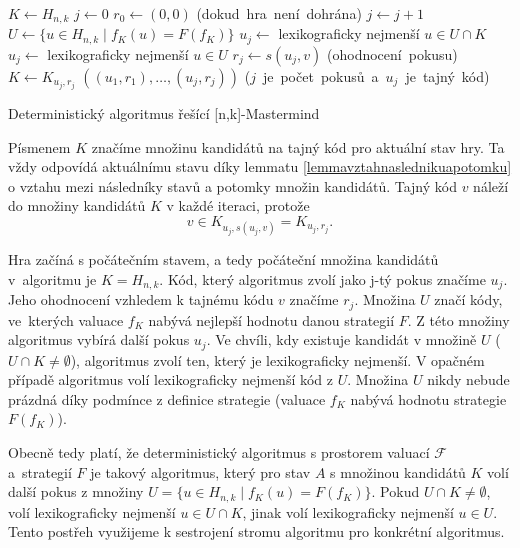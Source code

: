 
\begin{algorithm}[h!]
\begin{algorithmic}[1]  %
    \State $K \gets H_{n,k}$ 
    \State $j \gets 0$
    \State $r_0 \gets (0,0)$
     \hfill \mbox{(dokud hra není dohrána)}
        \State $j \gets j + 1$ 
	\State $U \gets \{u \in H_{n,k} \mid f_K(u) = F(f_K)\}$
            \State $u_j \gets$ lexikograficky nejmenší $u \in U \cap K$
	\Else
		\State $u_j \gets$ lexikograficky nejmenší $u \in U$
	\EndIf
        \State $r_j \gets s(u_j, v)$ \hfill \mbox{(ohodnocení pokusu)}
        \State $K \gets K_{u_j,r_j}$
    \EndWhile
    \State \Return $((u_1,r_1),\dots,(u_j, r_j))$ \hfill \mbox{($j$ je počet pokusů a $u_j$ je tajný kód)}
\EndFunction
\end{algorithmic}
\caption{Deterministický algoritmus řešící [n,k]-Mastermind}
\label{alg-default}
\end{algorithm}

Písmenem $K$ značíme množinu kandidátů na tajný kód pro aktuální stav hry. Ta vždy odpovídá aktuálnímu stavu díky lemmatu \ref{lemmavztahnaslednikuapotomku} o vztahu mezi následníky stavů a potomky množin kandidátů. Tajný kód $v$ náleží do množiny kandidátů $K$ v každé iteraci, protože 
\[v \in K_{u_j, s(u_j,v)} = K_{u_j, r_j}.\]

Hra začíná s počátečním stavem, a tedy počáteční množina kandidátů v~algoritmu je $K = H_{n,k}$. Kód, který algoritmus zvolí jako j-tý pokus značíme $u_j$. Jeho ohodnocení vzhledem k tajnému kódu $v$ značíme $r_j$. Množina $U$ značí kódy, ve~kterých valuace $f_K$ nabývá nejlepší hodnotu danou strategií $F$. Z této množiny algoritmus vybírá další pokus $u_j$. Ve chvíli, kdy existuje kandidát v množině $U$ ($U\cap K \neq \emptyset$), algoritmus zvolí ten, který je lexikograficky nejmenší. V opačném případě algoritmus volí lexikograficky nejmenší kód z $U$. Množina $U$ nikdy nebude prázdná díky podmínce z definice strategie (valuace $f_K$ nabývá hodnotu strategie $F(f_K)$). 

Obecně tedy platí, že deterministický algoritmus s prostorem valuací $\mathcal{F}$ a~strategií $F$ je takový algoritmus, který pro stav $A$ s množinou kandidátů $K$ volí další pokus z množiny $U = \{u \in H_{n,k} \mid f_K(u) = F(f_K)\}$. Pokud $U \cap K \neq \emptyset$, volí lexikograficky nejmenší $u \in U \cap K$, jinak volí lexikograficky nejmenší $u \in U$. Tento postřeh využijeme k sestrojení stromu algoritmu pro konkrétní algoritmus.



